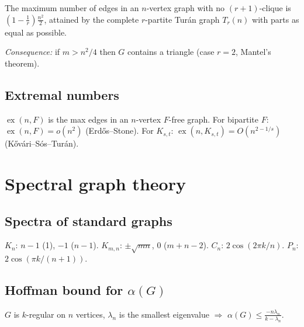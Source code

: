 The maximum number of edges in an $n$-vertex graph with no $(r+1)$-clique is $\left(1-\frac1r\right)\frac{n^2}{2}$, attained by the complete $r$-partite Tur\'an graph $T_r(n)$ with parts as equal as possible.

\textit{Consequence:} if $m>n^2/4$ then $G$ contains a triangle (case $r=2$, Mantel's theorem).

\subsection{Extremal numbers}
\label{subsec:extremal-numbers}

$\operatorname{ex}(n,F)$ is the max edges in an $n$-vertex $F$-free graph. For bipartite $F$: $\operatorname{ex}(n,F)=o(n^2)$ (Erd\H{o}s--Stone). For $K_{s,t}$: $\operatorname{ex}(n,K_{s,t})=O(n^{2-1/s})$ (K\H{o}v\'ari--S\'os--Tur\'an).

\medskip

\section{Spectral graph theory}
\label{sec:graph-spectra}

\subsection{Spectra of standard graphs}
\label{subsec:graph-spectra}

$K_n$: $n-1$ (1), $-1$ ($n-1$). $K_{m,n}$: $\pm\sqrt{mn}$, $0$ ($m+n-2$). $C_n$: $2\cos(2\pi k/n)$. $P_n$: $2\cos(\pi k/(n+1))$.

\subsection{Hoffman bound for $\alpha(G)$}
\label{subsec:hoffman}

$G$ is $k$-regular on $n$ vertices, $\lambda_n$ is the smallest eigenvalue $\Rightarrow$ $\alpha(G)\le\frac{-n\lambda_n}{k-\lambda_n}$.
